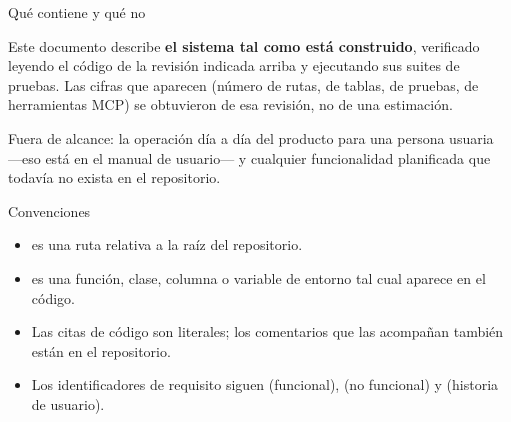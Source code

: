 \vspace{20pt}
{\pksb\large\color{pkInk} Qué contiene y qué no\par}
\vspace{8pt}

\begin{pknote}[Alcance]
Este documento describe \textbf{el sistema tal como está construido}, verificado
leyendo el código de la revisión indicada arriba y ejecutando sus suites de
pruebas. Las cifras que aparecen (número de rutas, de tablas, de pruebas, de
herramientas MCP) se obtuvieron de esa revisión, no de una estimación.

Fuera de alcance: la operación día a día del producto para una persona usuaria
—eso está en el manual de usuario— y cualquier funcionalidad planificada que
todavía no exista en el repositorio.
\end{pknote}

\vspace{6pt}
{\pksb\large\color{pkInk} Convenciones\par}
\vspace{8pt}

\begin{itemize}[leftmargin=1.1em,itemsep=2pt,topsep=2pt]
  \item {} es una ruta relativa a la raíz del repositorio.
  \item {} es una función, clase, columna o variable de entorno tal cual aparece en el código.
  \item Las citas de código son literales; los comentarios que las acompañan también están en el repositorio.
  \item Los identificadores de requisito siguen  (funcional),  (no funcional) y  (historia de usuario).
\end{itemize}
